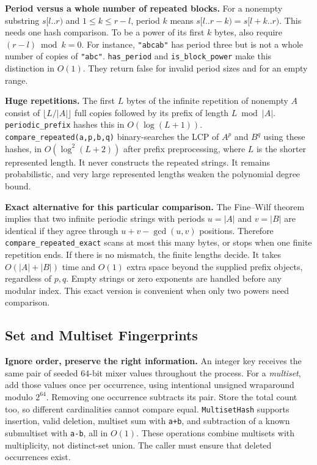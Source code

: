 \textbf{Period versus a whole number of repeated blocks.}
For a nonempty substring $s[l..r)$ and $1\le k\le r-l$, period $k$
means $s[l..r-k)=s[l+k..r)$. This needs one hash comparison.
To be a power of its first $k$ bytes, also require $(r-l)\bmod k=0$.
For instance, \texttt{"abcab"} has period three but is not a whole
number of copies of \texttt{"abc"}. \texttt{has\_period} and
\texttt{is\_block\_power} make this distinction in $O(1)$.
They return false for invalid period sizes and for an empty range.

\textbf{Huge repetitions.} The first $L$ bytes of the infinite
repetition of nonempty $A$ consist of $\lfloor L/|A|\rfloor$ full
copies followed by its prefix of length $L\bmod |A|$.
\texttt{periodic\_prefix} hashes this in $O(\log(L+1))$.
\texttt{compare\_repeated(a,p,b,q)} binary-searches the LCP of
$A^p$ and $B^q$ using these hashes, in $O(\log^2(L+2))$ after prefix
preprocessing, where $L$ is the shorter represented length.
It never constructs the repeated strings. It remains probabilistic,
and very large represented lengths weaken the polynomial degree bound.

\textbf{Exact alternative for this particular comparison.}
The Fine--Wilf theorem implies that two infinite periodic strings
with periods $u=|A|$ and $v=|B|$ are identical if they agree through
$u+v-\gcd(u,v)$ positions. Therefore
\texttt{compare\_repeated\_exact} scans at most this many bytes,
or stops when one finite repetition ends. If there is no mismatch,
the finite lengths decide. It takes $O(|A|+|B|)$ time and $O(1)$
extra space beyond the supplied prefix objects, regardless of $p,q$.
Empty strings or zero exponents are handled before any modular index.
This exact version is convenient when only two powers need comparison.


\subsection{Set and Multiset Fingerprints}
\textbf{Ignore order, preserve the right information.}
An integer key receives the same pair of seeded 64-bit mixer values
throughout the process. For a \emph{multiset}, add those values once
per occurrence, using intentional unsigned wraparound modulo
$2^{64}$. Removing one occurrence subtracts its pair.
Store the total count too, so different cardinalities cannot compare
equal. \texttt{MultisetHash} supports insertion, valid deletion,
multiset sum with \texttt{a+b}, and subtraction of a known
submultiset with \texttt{a-b}, all in $O(1)$.
These operations combine multisets with multiplicity, not distinct-set
union. The caller must ensure that deleted occurrences exist.

